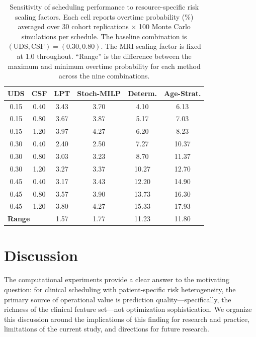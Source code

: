 \documentclass[11pt,a4paper]{article}
\begin{document}
\begin{table}[htbp]
\centering
\caption{Sensitivity of scheduling performance to resource-specific risk scaling factors. Each cell reports overtime probability (\%) averaged over 30 cohort replications $\times$ 100 Monte Carlo simulations per schedule. The baseline combination is $(\text{UDS}, \text{CSF}) = (0.30, 0.80)$. The MRI scaling factor is fixed at 1.0 throughout. ``Range'' is the difference between the maximum and minimum overtime probability for each method across the nine combinations.}
\label{tab:scaling_sensitivity}
\begin{tabular}{@{}cc cccc@{}}
\toprule
\textbf{UDS} & \textbf{CSF} & \textbf{LPT} & \textbf{Stoch-MILP} & \textbf{Determ.} & \textbf{Age-Strat.} \\
\midrule
0.15 & 0.40 & 3.43 & 3.70 & 4.10  & 6.13 \\
0.15 & 0.80 & 3.67 & 3.87 & 5.17  & 7.03 \\
0.15 & 1.20 & 3.97 & 4.27 & 6.20  & 8.23 \\
0.30 & 0.40 & 2.40 & 2.50 & 7.27  & 10.37 \\
0.30 & 0.80 & 3.03 & 3.23 & 8.70  & 11.37 \\
0.30 & 1.20 & 3.27 & 3.37 & 10.27 & 12.70 \\
0.45 & 0.40 & 3.17 & 3.43 & 12.20 & 14.90 \\
0.45 & 0.80 & 3.57 & 3.90 & 13.73 & 16.30 \\
0.45 & 1.20 & 3.80 & 4.27 & 15.33 & 17.93 \\
\midrule
\multicolumn{2}{l}{\textbf{Range}}     & 1.57 & 1.77 & 11.23 & 11.80 \\
\bottomrule
\end{tabular}
\end{table}

\section{Discussion}
\label{sec:discussion}

The computational experiments provide a clear answer to the motivating question: for clinical scheduling with patient-specific risk heterogeneity, the primary source of operational value is prediction quality---specifically, the richness of the clinical feature set---not optimization sophistication. We organize this discussion around the implications of this finding for research and practice, limitations of the current study, and directions for future research.
\end{document}
